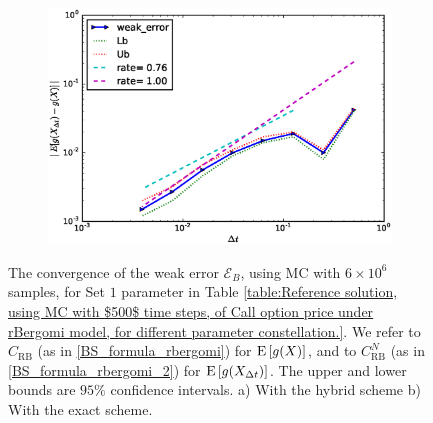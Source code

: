 {\begin{figure}[h!]
\begin{subfigure}{.4\textwidth}
		\caption{}
		\label{fig:set1_weak_rate_hybrid}
	\end{subfigure}%
	\begin{subfigure}{.4\textwidth}
		\centering
		\includegraphics[width=1\linewidth]{./figures/rBergomi_weak_error_cholesky/weak_convergence_order_Bergomi_H_007_K_1_M_4_10_6_CI_relative_cholesky_non_hierarchical_non_parallel_asymptotic}
		\caption{}
		\label{fig:set1_weak_rate_exact}
	\end{subfigure}
	\caption{The convergence of the weak error $\mathcal{E}_B$, using MC with $6 \times 10^6$ samples, for Set $1$ parameter in Table \ref{table:Reference solution, using MC with $500$ time steps, of Call option price under rBergomi model, for different parameter constellation.}. We refer to $C_{\text{RB}}$ (as in \eqref{BS_formula_rbergomi}) for $\mathrm{E}\left[g(X)\right]$, and to $C_{\text{RB}}^{N}$ (as in \eqref{BS_formula_rbergomi_2}) for $\mathrm{E}\left[g(X_{\Delta t})\right]$. The upper and lower bounds are $95\%$ confidence intervals. a) With the hybrid scheme  b) With the exact scheme.}
	\label{fig:Weak_rate_set1_set_2_without_rich_hyb+chol}
\end{figure}
\FloatBarrier
}

